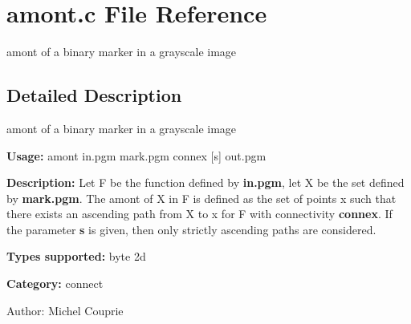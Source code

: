 \section{amont.c File Reference}
\label{amont_8c}
amont of a binary marker in a grayscale image 



\subsection{Detailed Description}
amont of a binary marker in a grayscale image 

{\bf Usage:} amont in.pgm mark.pgm connex [s] out.pgm

{\bf Description:} Let F be the function defined by {\bf in.pgm}, let X be the set defined by {\bf mark.pgm}. The amont of X in F is defined as the set of points x such that there exists an ascending path from X to x for F with connectivity {\bf connex}. If the parameter {\bf s} is given, then only strictly ascending paths are considered.

{\bf Types supported:} byte 2d

{\bf Category:} connect

\begin{Desc}
\item[Author:]Michel Couprie \end{Desc}
